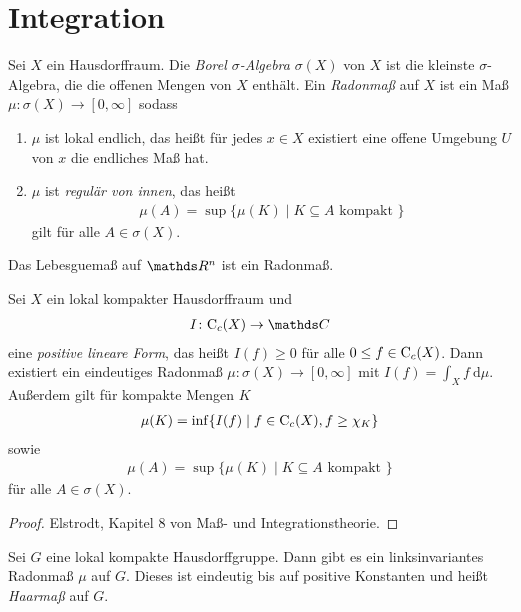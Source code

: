 \chapter{Integration}
\begin{defi}
Sei $X$ ein Hausdorffraum. Die \emph{Borel $\sigma$-Algebra} $\sigma(X)$ von $X$ ist die kleinste $\sigma$-Algebra, die die offenen Mengen von $X$ enthält.
Ein \emph{Radonmaß} auf $X$ ist ein Maß $\mu \colon \sigma(X) \to [0,\infty]$ sodass
\begin{enumerate}[label=\roman*)]
\item $\mu$ ist lokal endlich, das heißt für jedes $x\in X$ existiert eine offene Umgebung $U$ von $x$ die endliches Maß hat.
\item $\mu$ ist \emph{regulär von innen}, das heißt
\begin{align*}
\mu(A)=\sup\{\mu(K)\mid K\subseteq A \text{ kompakt }\}
\end{align*}
gilt für alle $A \in \sigma(X)$.
\end{enumerate}
\end{defi}

\begin{bsp}
Das Lebesguemaß auf $\Rn$ ist ein Radonmaß.
\end{bsp}

\begin{thm}[Riesz]
Sei $X$ ein lokal kompakter Hausdorffraum und
\begin{align*}
I \colon \CC_c(X) \to \C
\end{align*}
eine \emph{positive lineare Form}, das heißt $I(f)\geq 0$ für alle $0\leq f \in \mathrm{C}_c(X)$.
Dann existiert ein eindeutiges Radonmaß $\mu \colon \sigma(X)\to [0,\infty]$ mit $I(f)=\int_X f ~\mathrm{d}\mu$.
Außerdem gilt für kompakte Mengen $K$
\begin{align*}
\mu(K)=\inf\{I(f)\mid f\in \mathrm{C}_c(X),f \geq \chi_K\}
\end{align*}
sowie
\begin{align*}
\mu(A)=\sup\{\mu(K)\mid K\subseteq A \text{ kompakt }\}
\end{align*}
für alle $A \in \sigma(X)$.
\end{thm}
\begin{proof}
Elstrodt, Kapitel 8 von Maß- und Integrationstheorie.
\end{proof}

\begin{thm}[Haar]
Sei $G$ eine lokal kompakte Hausdorffgruppe.
Dann gibt es ein linksinvariantes Radonmaß $\mu$ auf $G$.
Dieses ist eindeutig bis auf positive Konstanten und heißt \emph{Haarmaß} auf $G$.
\end{thm}

